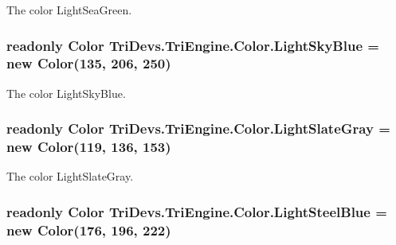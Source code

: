 The color Light\-Sea\-Green. 

\hypertarget{struct_tri_devs_1_1_tri_engine_1_1_color_a885f0f539825a5833a6531bac3377571}{
\subsubsection[{Light\-Sky\-Blue}]{\setlength{\rightskip}{0pt plus 5cm}readonly {\bf Color} Tri\-Devs.\-Tri\-Engine.\-Color.\-Light\-Sky\-Blue = new {\bf Color}(135, 206, 250)\hspace{0.3cm}{\ttfamily [static]}}}\label{struct_tri_devs_1_1_tri_engine_1_1_color_a885f0f539825a5833a6531bac3377571}


The color Light\-Sky\-Blue. 

\hypertarget{struct_tri_devs_1_1_tri_engine_1_1_color_a453a379ff916decb97bd3ffec1ce0459}{
\subsubsection[{Light\-Slate\-Gray}]{\setlength{\rightskip}{0pt plus 5cm}readonly {\bf Color} Tri\-Devs.\-Tri\-Engine.\-Color.\-Light\-Slate\-Gray = new {\bf Color}(119, 136, 153)\hspace{0.3cm}{\ttfamily [static]}}}\label{struct_tri_devs_1_1_tri_engine_1_1_color_a453a379ff916decb97bd3ffec1ce0459}


The color Light\-Slate\-Gray. 

\hypertarget{struct_tri_devs_1_1_tri_engine_1_1_color_aaa55145084c4f0a339f0e3cea78caa3a}{
\subsubsection[{Light\-Steel\-Blue}]{\setlength{\rightskip}{0pt plus 5cm}readonly {\bf Color} Tri\-Devs.\-Tri\-Engine.\-Color.\-Light\-Steel\-Blue = new {\bf Color}(176, 196, 222)\hspace{0.3cm}{\ttfamily [static]}}}\label{struct_tri_devs_1_1_tri_engine_1_1_color_aaa55145084c4f0a339f0e3cea78caa3a}


